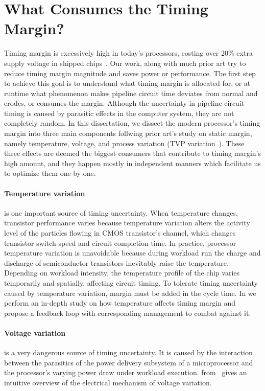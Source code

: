 \section{What Consumes the Timing Margin?}
\label{sec:background:components}

Timing margin is excessively high in today's processors, costing over 20\% extra supply voltage in shipped chips~\cite{reddi2010voltage, leng2015gpu}. Our work, along with much prior art try to reduce timing margin magnitude and saves power or performance. The first step to achieve this goal is to understand what timing margin is allocated for, or at runtime what phenomenon makes pipeline circuit time deviates from normal and erodes, or consumes the margin. Although the uncertainty in pipeline circuit timing is caused by parasitic effects in the computer system, they are not completely random. In this dissertation, we dissect the modern processor's timing margin into three main components follwing prior art's study on static margin, namely temperature, voltage, and process variation (TVP variation~\cite{reddi2013resilient}). These three effects are deemed the biggest consumers that contribute to timing margin's high amount, and they happen mostly in independent manners which facilitate us to optimize them one by one.

\paragraph{Temperature variation} is one important source of timing uncertainty. When temperature changes, transistor performance varies because temperature variation alters the activity level of the particles flowing in CMOS transistor's channel, which changes transistor switch speed and circuit completion time. In practice, processor temperature variation is unavoidable because during workload run the charge and discharge of semiconductor transistors inevitably raise the temperature. Depending on workload intensity, the temperature profile of the chip varies temporarily and spatially, affecting circuit timing. To tolerate timing uncertainty caused by temperature variation, margin must be added in the cycle time. In  we perform an in-depth study on how temperature affects timing margin and propose a feedback loop with corresponding management to combat against it.

\paragraph{Voltage variation} is a very dangerous source of timing uncertainty. It is caused by the interaction between the parasitics of the power delivery subsystem of a microprocessor and the processor's varying power draw under workload execution.  from~\cite{leng2014gpuvolt} gives an intuitive overview of the electrical mechanism of voltage variation.

